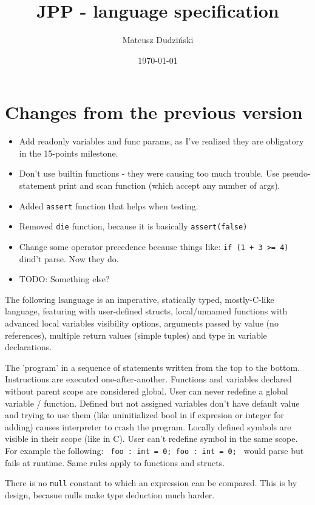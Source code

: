 \documentclass[11pt]{article}
\author{Mateusz Dudziński}
\date{\today}
\title{JPP - language specification}
\begin{document}
\maketitle

\section*{Changes from the previous version}
\label{sec:org4f220f0}
\begin{itemize}
\item Add readonly variables and func params, as I've realized they are
obligatory in the 15-points milestone.
\item Don't use builtin functions - they were causing too much
trouble. Use pseudo-statement print and scan function (which
accept any number of args).
\item Added \texttt{assert} function that helps when testing.
\item Removed \texttt{die} function, because it is basically \texttt{assert(false)}
\item Change some operator precedence because things like: \texttt{if (1 + 3 >= 4)} dind't parse. Now they do.
\item TODO: Something else?
\end{itemize}


The following lsanguage is an imperative, statically typed, mostly-C-like
language, featuring with user-defined structs, local/unnamed functions with
advanced local variables visibility options, arguments passed by value (no
references), multiple return values (simple tuples) and type in variable
declarations.

The 'program' in a sequence of statements written from the top to the bottom.
Instructions are executed one-after-another.  Functions and variables declared
without parent scope are considered global.  User can never redefine a global
variable / function. Defined but not assigned variables don't have default value
and trying to use them (like uninitialized bool in if expresion or integer for
adding) causes interpreter to crash the program. Locally defined symbols are
visible in their scope (like in C). User can't redefine symbol in the same
scope. For example the following: \texttt{ foo : int = 0; foo : int = 0; } would
parse but fails at runtime. Same rules apply to functions and structs.

There is no \texttt{null} constant to which an expression can be compared. This
is by design, becasue nulls make type deduction much harder.
\end{document}
